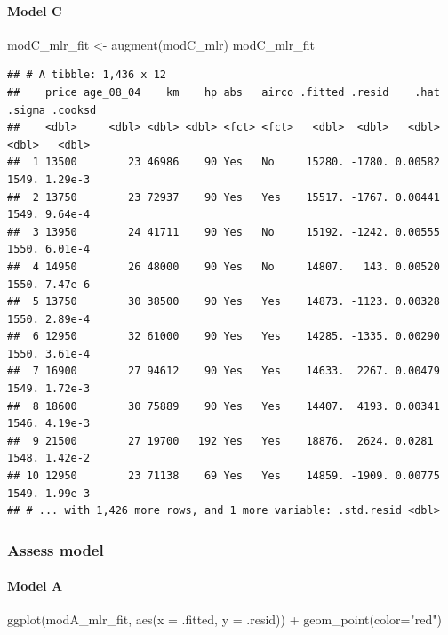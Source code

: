 \documentclass[
]{article}
\newenvironment{Shaded}{\begin{snugshade}}{\end{snugshade}}
\newcommand{\AttributeTok}[1]{\textcolor[rgb]{0.77,0.63,0.00}{#1}}
\newcommand{\FunctionTok}[1]{\textcolor[rgb]{0.00,0.00,0.00}{#1}}
\newcommand{\NormalTok}[1]{#1}
\newcommand{\OtherTok}[1]{\textcolor[rgb]{0.56,0.35,0.01}{#1}}
\newcommand{\SpecialCharTok}[1]{\textcolor[rgb]{0.00,0.00,0.00}{#1}}
\newcommand{\StringTok}[1]{\textcolor[rgb]{0.31,0.60,0.02}{#1}}
\begin{document}
\hypertarget{model-c-9}{%
\paragraph{Model C}\label{model-c-9}}

\begin{Shaded}
\begin{Highlighting}[]
\NormalTok{modC\_mlr\_fit }\OtherTok{\textless{}{-}} \FunctionTok{augment}\NormalTok{(modC\_mlr)}
\NormalTok{modC\_mlr\_fit}
\end{Highlighting}
\end{Shaded}

\begin{verbatim}
## # A tibble: 1,436 x 12
##    price age_08_04    km    hp abs   airco .fitted .resid    .hat .sigma .cooksd
##    <dbl>     <dbl> <dbl> <dbl> <fct> <fct>   <dbl>  <dbl>   <dbl>  <dbl>   <dbl>
##  1 13500        23 46986    90 Yes   No     15280. -1780. 0.00582  1549. 1.29e-3
##  2 13750        23 72937    90 Yes   Yes    15517. -1767. 0.00441  1549. 9.64e-4
##  3 13950        24 41711    90 Yes   No     15192. -1242. 0.00555  1550. 6.01e-4
##  4 14950        26 48000    90 Yes   No     14807.   143. 0.00520  1550. 7.47e-6
##  5 13750        30 38500    90 Yes   Yes    14873. -1123. 0.00328  1550. 2.89e-4
##  6 12950        32 61000    90 Yes   Yes    14285. -1335. 0.00290  1550. 3.61e-4
##  7 16900        27 94612    90 Yes   Yes    14633.  2267. 0.00479  1549. 1.72e-3
##  8 18600        30 75889    90 Yes   Yes    14407.  4193. 0.00341  1546. 4.19e-3
##  9 21500        27 19700   192 Yes   Yes    18876.  2624. 0.0281   1548. 1.42e-2
## 10 12950        23 71138    69 Yes   Yes    14859. -1909. 0.00775  1549. 1.99e-3
## # ... with 1,426 more rows, and 1 more variable: .std.resid <dbl>
\end{verbatim}

\hypertarget{assess-model}{%
\subsubsection{Assess model}\label{assess-model}}

\hypertarget{model-a-11}{%
\paragraph{Model A}\label{model-a-11}}

\begin{Shaded}
\begin{Highlighting}[]
\FunctionTok{ggplot}\NormalTok{(modA\_mlr\_fit, }\FunctionTok{aes}\NormalTok{(}\AttributeTok{x =}\NormalTok{ .fitted, }\AttributeTok{y =}\NormalTok{ .resid)) }\SpecialCharTok{+}
  \FunctionTok{geom\_point}\NormalTok{(}\AttributeTok{color=}\StringTok{"red"}\NormalTok{)}
\end{Highlighting}
\end{Shaded}
\end{document}
